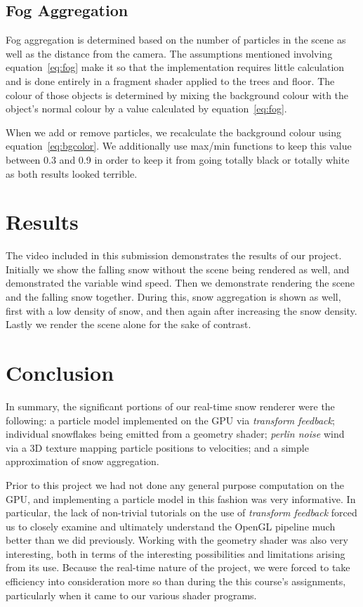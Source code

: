 \documentclass[conference]{acmsiggraph}
\begin{document}
\subsection{Fog Aggregation}
Fog aggregation is determined based on the number of particles in the scene as well as the distance from the camera. The assumptions mentioned involving equation~\ref{eq:fog} make it so that the implementation requires little calculation and is done entirely in a fragment shader applied to the trees and floor. The colour of those objects is determined by mixing the background colour with the object's normal colour by a value calculated by equation~\ref{eq:fog}.

When we add or remove particles, we recalculate the background colour using equation~\ref{eq:bgcolor}. We additionally use max/min functions to keep this value between 0.3 and 0.9 in order to keep it from going totally black or totally white as both results looked terrible.

\section{Results}
The video included in this submission demonstrates the results of our project. Initially we show the falling snow without the scene being rendered as well, and demonstrated the variable wind speed. Then we demonstrate rendering the scene and the falling snow together. During this, snow aggregation is shown as well, first with a low density of snow, and then again after increasing the snow density. Lastly we render the scene alone for the sake of contrast. 

\section{Conclusion}
In summary, the significant portions of our real-time snow renderer were the following: a particle model implemented on the GPU via \textit{transform feedback}; individual snowflakes being emitted from a geometry shader; \textit{perlin noise} wind via a 3D texture mapping particle positions to velocities; and a simple approximation of snow aggregation.

Prior to this project we had not done any general purpose computation on the GPU, and implementing a particle model in this fashion was very informative. In particular, the lack of non-trivial tutorials on the use of \textit{transform feedback} forced us to closely examine and ultimately understand the OpenGL pipeline much better than we did previously. Working with the geometry shader was also very interesting, both in terms of the interesting possibilities and limitations arising from its use. Because the real-time nature of the project, we were forced to take efficiency into consideration more so than during the this course's assignments, particularly when it came to our various shader programs.
\end{document}
